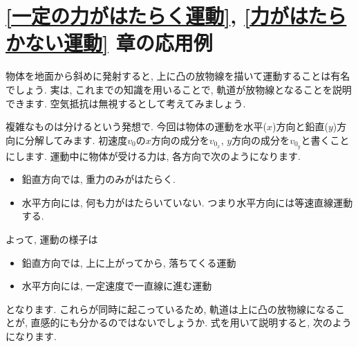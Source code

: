 \documentclass[11pt,dvipdfmx]{jsarticle}
\numberwithin{equation}{section} %
\begin{document}
\section{\ref{一定の力がはたらく運動}, \ref{力がはたらかない運動} 章の応用例}
物体を地面から斜めに発射すると, 上に凸の放物線を描いて運動することは有名でしょう. 実は, これまでの知識を用いることで, 軌道が放物線となることを説明できます. 空気抵抗は無視するとして考えてみましょう. 
\begin{center}
\end{center}
複雑なものは分けるという発想で. 今回は物体の運動を水平($x$)方向と鉛直($y$)方向に分解してみます. 初速度$v_{0}$の$x$方向の成分を$v_{0_{x}}$, $y$方向の成分を$v_{0_{y}}$と書くことにします. 運動中に物体が受ける力は, 各方向で次のようになります.
\begin{itemize}
    \item 鉛直方向では, 重力のみがはたらく. 
    \item 水平方向には, 何も力がはたらいていない. つまり水平方向には等速直線運動する. 
\end{itemize}
よって, 運動の様子は
\begin{itemize}
    \item 鉛直方向では, 上に上がってから, 落ちてくる運動
    \item 水平方向には, 一定速度で一直線に進む運動
\end{itemize}
となります. これらが同時に起こっているため, 軌道は上に凸の放物線になることが, 直感的にも分かるのではないでしょうか. 式を用いて説明すると, 次のようになります. 
\end{document}
